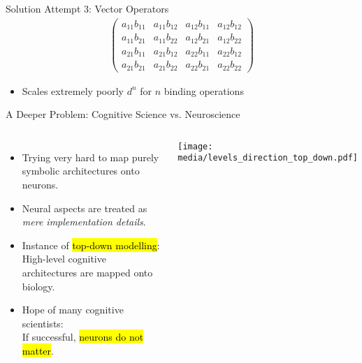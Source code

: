 \documentclass[handout,aspectratio=169]{beamer}
\begin{document}
\begin{frame}{Solution Attempt 3: Vector Operators}
\begin{align*}
\begin{pmatrix}
		a_{11} b_{11} & a_{11} b_{12} & a_{12} b_{11} & a_{12} b_{12} \\
		a_{11} b_{21} & a_{11} b_{22} & a_{12} b_{21} & a_{12} b_{22} \\
		a_{21} b_{11} & a_{21} b_{12} & a_{22} b_{11} & a_{22} b_{12} \\
		a_{21} b_{21} & a_{21} b_{22} & a_{22} b_{21} & a_{22} b_{22}
		\end{pmatrix}
		\end{align*}
		\vspace*{-0.25cm}
		\begin{itemize}
			\centering
			\item<2->[\OMinus] Scales extremely poorly $d^n$ for $n$ binding operations
		\end{itemize}
	\end{frame}

	\begin{frame}{A Deeper Problem: Cognitive Science vs. Neuroscience}
		\begin{columns}
		\begin{itemize}
			\setlength{\itemsep}{0.75cm}
			\item Trying very hard to map purely symbolic architectures onto neurons.
			\item Neural aspects are treated as\\\emph{mere implementation details}.
			\item Instance of \hl{top-down modelling}:\\High-level cognitive architectures are mapped onto biology.
			\item Hope of many cognitive scientists:\\If successful, \hl{neurons do not matter}.
		\end{itemize}
		\texttt{[image: media/levels\_direction\_top\_down.pdf]}
		\end{columns}
	\end{frame}
\end{document}
